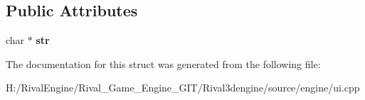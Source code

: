 \subsection*{Public Attributes}
\begin{DoxyCompactItemize}
\item 
\mbox{\label{struct_u_i_1_1_text_string_ab1a09f25ab0b9b01b33ecc5aafbe4c99}} 
char $\ast$ {\bfseries str}
\end{DoxyCompactItemize}


The documentation for this struct was generated from the following file\+:\begin{DoxyCompactItemize}
\item 
H\+:/\+Rival\+Engine/\+Rival\+\_\+\+Game\+\_\+\+Engine\+\_\+\+G\+I\+T/\+Rival3dengine/source/engine/ui.\+cpp\end{DoxyCompactItemize}
